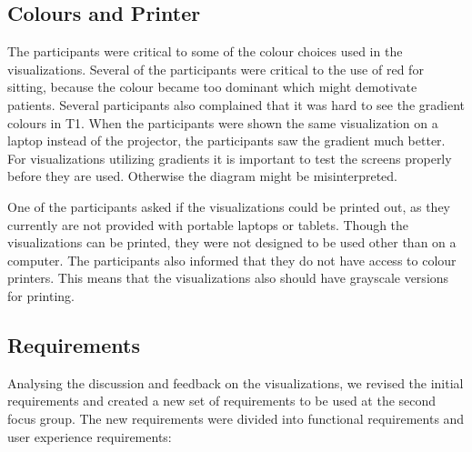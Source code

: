 \subsection{Colours and Printer}
The participants were critical to some of the colour choices used in the visualizations. Several of the participants were critical to the use of red for sitting, because the colour became too dominant which might demotivate patients. Several participants also complained that it was hard to see the gradient colours in T1. When the participants were shown the same visualization on a laptop instead of the projector, the participants saw the gradient much better. For visualizations utilizing gradients it is important to test the screens properly before they are used. Otherwise the diagram might be misinterpreted. 

One of the participants asked if the visualizations could be printed out, as they currently are not provided with portable laptops or tablets. Though the visualizations can be printed, they were not designed to be used other than on a computer. The participants also informed that they do not have access to colour printers. This means that the visualizations also should have grayscale versions for printing. 

\subsection{Requirements}
Analysing the discussion and feedback on the visualizations, we revised the initial requirements and created a new set of requirements to be used at the second focus group. The new requirements were divided into functional requirements and user experience requirements:

